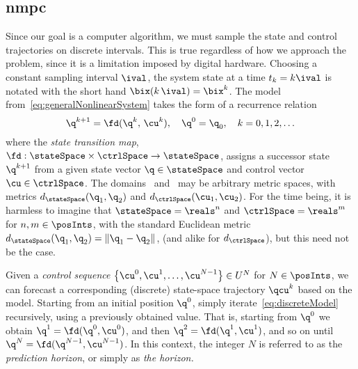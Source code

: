 \subsection{\acl{nmpc}}%


Since our goal is a computer algorithm, we must sample the state and control
trajectories on discrete intervals. This is true
regardless of how we approach the problem, since it is a limitation imposed by
digital hardware. Choosing a constant sampling interval $\ival$, the system
state at a time $t_k = k\ival$ is notated with the short hand $\bix(k\,\ival) =
\bix^k$. The model from~\eqref{eq:generalNonlinearSystem} takes the form of a
recurrence relation
%
\begin{equation}\label{eq:discreteModel}
  \q^{k+1} = \fd(\q^k,\, \cu^k),\quad\q^0 = \q_0,\quad k = 0,1,2,\ldots
\end{equation}
%
where the \emph{state transition map},
$\fd:\stateSpace\times\ctrlSpace\rightarrow\stateSpace$, assigns a successor
state $\q^{k+1}$ from a given state vector $\q\in\stateSpace$ and control vector
$\cu\in\ctrlSpace$. The domains \stateSpace\ and \ctrlSpace\ may be arbitrary
metric spaces, with metrics $d_\stateSpace(\q_1, \q_2)$ and $d_\ctrlSpace(\cu_1,
\cu_2)$. For the time being, it is harmless to imagine that $\stateSpace =
\reals^n$ and $\ctrlSpace = \reals^m$ for $n,m \in \posInts$, with the standard
Euclidean metric $d_\stateSpace(\q_1, \q_2) = \norm{\q_1 - \q_2}$, (and alike
for $d_\ctrlSpace$), but this need not be the case.

Given a \emph{control sequence}
$\bigl\{\cu^0,\cu^1,\ldots,\cu^{N-1}\bigr\} \in U^{N}$ for $N\in\posInts$, we
can forecast a corresponding (discrete) state-space trajectory $\qcu^k$ based on
the model. Starting from an initial position $\q^0$, simply
iterate~\eqref{eq:discreteModel} recursively, using a previously obtained value.
That is, starting from $\q^0$ we obtain $\q^1 = \fd(\q^0, \cu^0)$, and then
$\q^2 = \fd(\q^1, \cu^1)$, and so on until $\q^N = \fd(\q^{N-1}, \cu^{N-1})$. In
this context, the integer $N$ is referred to as the \emph{prediction
horizon}, or simply as \emph{the horizon.}

